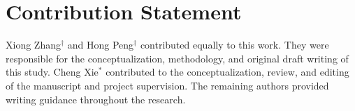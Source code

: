 \documentclass{article}
\begin{document}
\label{sec: contribution}
\section*{Contribution Statement}
Xiong Zhang$^{{\dagger}}$ and Hong Peng$^{{\dagger}}$ contributed equally to this work. They were responsible for the conceptualization, methodology, and original draft writing of this study. Cheng Xie$^*$ contributed to the conceptualization, review, and editing of the manuscript and project supervision. The remaining authors provided writing guidance throughout the research.



















\end{document}
